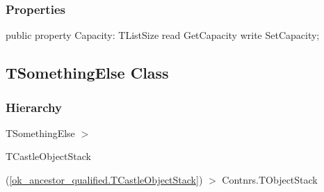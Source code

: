 \documentclass{report}
\newif\ifpdf
\begin{document}
\subsubsection*{\large{\textbf{Properties}}\normalsize\hspace{1ex}\hfill}
\begin{list}{}{
\setlength{\itemindent}{0cm}
\setlength{\listparindent}{0cm}
\setlength{\leftmargin}{\evensidemargin}
\addtolength{\leftmargin}{\tmplength}
\settowidth{\labelsep}{X}
\addtolength{\leftmargin}{\labelsep}
\setlength{\labelwidth}{\tmplength}
}
\label{ok_ancestor_qualified.TCastleObjectStack-Capacity}
\item[\textbf{Capacity}\hfill]
\ifpdf
\begin{flushleft}
\fi
\begin{ttfamily}
public property Capacity: TListSize read GetCapacity write SetCapacity;\end{ttfamily}

\ifpdf
\end{flushleft}
\fi


\par  \end{list}
\ifpdf
\subsection*{\large{\textbf{TSomethingElse Class}}\normalsize\hspace{1ex}\hrulefill}
\else
\subsection*{TSomethingElse Class}
\fi
\label{ok_ancestor_qualified.TSomethingElse}
\subsubsection*{\large{\textbf{Hierarchy}}\normalsize\hspace{1ex}\hfill}
TSomethingElse {$>$} \begin{ttfamily}TCastleObjectStack\end{ttfamily}(\ref{ok_ancestor_qualified.TCastleObjectStack}) {$>$} 
Contnrs.TObjectStack
\end{document}
